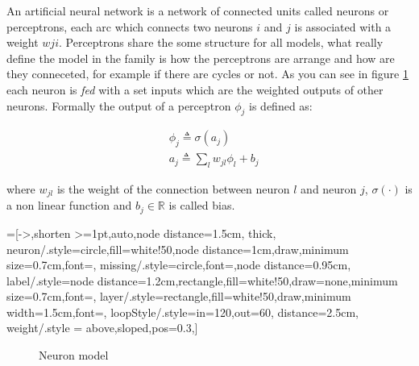  
An artificial neural network is a network of connected units called neurons or perceptrons, each arc which connects two neurons $i$ and $j$ is associated with a weight $wji$. Perceptrons share the some
structure for all models, what really define the model in the family is how the perceptrons are arrange and how are they conneceted, for example if there are cycles or not.
As you can see in figure \ref{neuron_model} each neuron is \textit{fed} with a set inputs which are the weighted outputs of other neurons. Formally the output of a perceptron $\phi_j$
is defined as:
 
\begin{align}
&\phi_j \triangleq \sigma(a_j)\\
&a_j \triangleq \sum_l w_{jl}\phi_l +b_j
\end{align}

where $w_{jl}$ is the weight of the connection between neuron $l$ and neuron $j$, $\sigma(\cdot)$ is a non linear function and $b_j \in \mathbb{R}$ is called bias.


=[->,shorten >=1pt,auto,node distance=1.5cm,
  thick,
  neuron/.style={circle,fill=white!50,node distance=1cm,draw,minimum size=0.7cm,font=\sffamily\normalsize},
  missing/.style={circle,font=\sffamily\Large,node distance=0.95cm},
  label/.style={node distance=1.2cm,rectangle,fill=white!50,draw=none,minimum size=0.7cm,font=\sffamily\normalsize},
  layer/.style={rectangle,fill=white!50,draw,minimum width=1.5cm,font=\sffamily\Large},
  loopStyle/.style={in=120,out=60, distance=2.5cm},
  weight/.style = {above,sloped,pos=0.3},]
\begin{figure}
 \centering
{}
\caption{Neuron model}
\label{neuron_model}
\end{figure}


